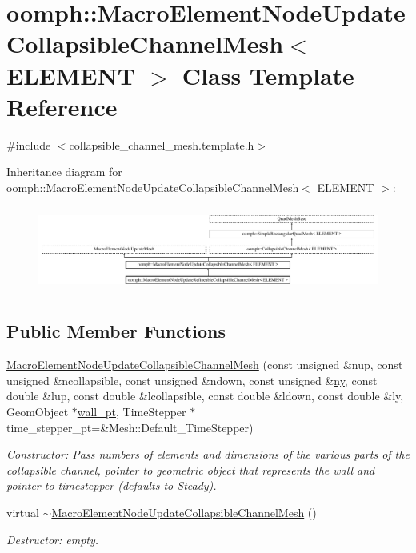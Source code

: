 \hypertarget{classoomph_1_1MacroElementNodeUpdateCollapsibleChannelMesh}{}\section{oomph\+:\+:Macro\+Element\+Node\+Update\+Collapsible\+Channel\+Mesh$<$ E\+L\+E\+M\+E\+NT $>$ Class Template Reference}
\label{classoomph_1_1MacroElementNodeUpdateCollapsibleChannelMesh}


{\ttfamily \#include $<$collapsible\+\_\+channel\+\_\+mesh.\+template.\+h$>$}

Inheritance diagram for oomph\+:\+:Macro\+Element\+Node\+Update\+Collapsible\+Channel\+Mesh$<$ E\+L\+E\+M\+E\+NT $>$\+:\begin{figure}[H]
\begin{center}
\leavevmode
\includegraphics[height=2.828283cm]{classoomph_1_1MacroElementNodeUpdateCollapsibleChannelMesh}
\end{center}
\end{figure}
\subsection*{Public Member Functions}
\begin{DoxyCompactItemize}
\item 
\hyperlink{classoomph_1_1MacroElementNodeUpdateCollapsibleChannelMesh_a5b7f150c4569c8d59d8220980a84cac5}{Macro\+Element\+Node\+Update\+Collapsible\+Channel\+Mesh} (const unsigned \&nup, const unsigned \&ncollapsible, const unsigned \&ndown, const unsigned \&\hyperlink{classoomph_1_1SimpleRectangularQuadMesh_a45011f22dedd480392b1f376e4269921}{ny}, const double \&lup, const double \&lcollapsible, const double \&ldown, const double \&ly, Geom\+Object $\ast$\hyperlink{classoomph_1_1CollapsibleChannelMesh_a04ffeb61678763dfd250962ea9ba614b}{wall\+\_\+pt}, Time\+Stepper $\ast$time\+\_\+stepper\+\_\+pt=\&Mesh\+::\+Default\+\_\+\+Time\+Stepper)
\begin{DoxyCompactList}\small\item\em Constructor\+: Pass numbers of elements and dimensions of the various parts of the collapsible channel, pointer to geometric object that represents the wall and pointer to timestepper (defaults to Steady). \end{DoxyCompactList}\item 
virtual \hyperlink{classoomph_1_1MacroElementNodeUpdateCollapsibleChannelMesh_a284ffdb8ab08e5f817b14d69913f4496}{$\sim$\+Macro\+Element\+Node\+Update\+Collapsible\+Channel\+Mesh} ()
\begin{DoxyCompactList}\small\item\em Destructor\+: empty. \end{DoxyCompactList}\end{DoxyCompactItemize}
